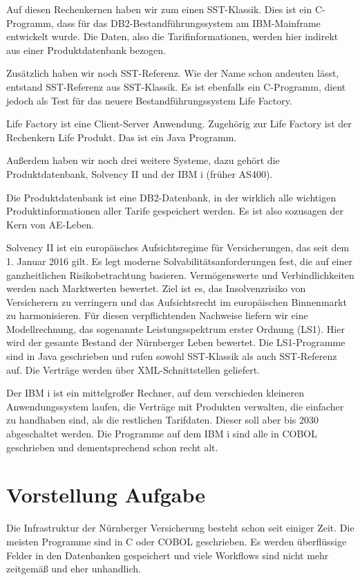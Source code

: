 Auf diesen Rechenkernen haben wir zum einen SST-Klassik. Dies ist ein C-Programm, dass für das DB2-Bestandführungssystem am IBM-Mainframe entwickelt wurde.
Die Daten, also die Tarifinformationen, werden hier indirekt aus einer Produktdatenbank bezogen.

Zusätzlich haben wir noch SST-Referenz. Wie der Name schon andeuten lässt, entstand SST-Referenz aus SST-Klassik. Es ist ebenfalls ein C-Programm, dient jedoch als Test für das neuere
Bestandführungssystem Life Factory. 

Life Factory ist eine Client-Server Anwendung. Zugehörig zur Life Factory ist der Rechenkern Life Produkt. Das ist ein Java Programm.

Außerdem haben wir noch drei weitere Systeme, dazu gehört die Produktdatenbank, Solvency II und der IBM i (früher AS400).

Die Produktdatenbank ist eine DB2-Datenbank, in der wirklich alle wichtigen Produktinformationen aller Tarife gespeichert werden. Es ist also sozusagen der Kern von AE-Leben.

Solvency II ist ein europäisches Aufsichtsregime für Versicherungen, das seit dem 1. Januar 2016 gilt. Es legt moderne Solvabilitätsanforderungen fest, die auf einer ganzheitlichen Risikobetrachtung basieren. Vermögenswerte und Verbindlichkeiten werden nach Marktwerten bewertet. Ziel ist es, das Insolvenzrisiko von Versicherern zu verringern und das Aufsichtsrecht im europäischen Binnenmarkt zu harmonisieren. \cite{Bafin2016}
Für diesen verpflichtenden Nachweise liefern wir eine Modellrechnung, das sogenannte Leistungsspektrum erster Ordnung (LS1). Hier wird der gesamte Bestand der Nürnberger Leben bewertet. Die LS1-Programme sind in Java geschrieben und rufen sowohl SST-Klassik als auch SST-Referenz auf. Die Verträge werden über XML-Schnittstellen geliefert.

Der IBM i ist ein mittelgroßer Rechner, auf dem verschieden kleineren Anwendungssystem laufen, die Verträge mit Produkten verwalten, die einfacher zu handhaben sind, als die restlichen Tarifdaten. Dieser soll aber bis 2030 abgeschaltet werden.
Die Programme auf dem IBM i sind alle in COBOL geschrieben und dementsprechend schon recht alt. 

\section{Vorstellung Aufgabe}
Die Infrastruktur der Nürnberger Versicherung besteht schon seit einiger Zeit. Die meisten Programme sind in C oder COBOL geschrieben.
Es werden überflüssige Felder in den Datenbanken gespeichert und viele Workflows sind nicht mehr zeitgemäß und eher unhandlich.

